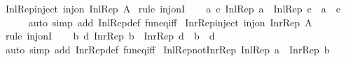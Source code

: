 \begin{isabellebody}
\endisatagproof
{\isafoldproof}%
%
\isadelimproof
\isanewline
%
\endisadelimproof
\isanewline
{}\isamarkupfalse%
\ Inl{\isacharunderscore}{\kern0pt}Rep{\isacharunderscore}{\kern0pt}inject{\isacharcolon}{\kern0pt}\ {\isachardoublequoteopen}inj{\isacharunderscore}{\kern0pt}on\ Inl{\isacharunderscore}{\kern0pt}Rep\ A{\isachardoublequoteclose}\isanewline
%
\isadelimproof
%
\endisadelimproof
%
\isatagproof
{}\isamarkupfalse%
\ {\isacharparenleft}{\kern0pt}rule\ inj{\isacharunderscore}{\kern0pt}onI{\isacharparenright}{\kern0pt}\isanewline
\ \ \isamarkupfalse%
\ {\isachardoublequoteopen}{\isasymAnd}a\ c{\isachardot}{\kern0pt}\ Inl{\isacharunderscore}{\kern0pt}Rep\ a\ {\isacharequal}{\kern0pt}\ Inl{\isacharunderscore}{\kern0pt}Rep\ c\ {\isasymLongrightarrow}\ a\ {\isacharequal}{\kern0pt}\ c{\isachardoublequoteclose}\isanewline
\ \ \ \ \isamarkupfalse%
\ {\isacharparenleft}{\kern0pt}auto\ simp\ add{\isacharcolon}{\kern0pt}\ Inl{\isacharunderscore}{\kern0pt}Rep{\isacharunderscore}{\kern0pt}def\ fun{\isacharunderscore}{\kern0pt}eq{\isacharunderscore}{\kern0pt}iff{\isacharparenright}{\kern0pt}\isanewline
{}\isamarkupfalse%
%
\endisatagproof
{\isafoldproof}%
%
\isadelimproof
\isanewline
%
\endisadelimproof
\isanewline
{}\isamarkupfalse%
\ Inr{\isacharunderscore}{\kern0pt}Rep{\isacharunderscore}{\kern0pt}inject{\isacharcolon}{\kern0pt}\ {\isachardoublequoteopen}inj{\isacharunderscore}{\kern0pt}on\ Inr{\isacharunderscore}{\kern0pt}Rep\ A{\isachardoublequoteclose}\isanewline
%
\isadelimproof
%
\endisadelimproof
%
\isatagproof
{}\isamarkupfalse%
\ {\isacharparenleft}{\kern0pt}rule\ inj{\isacharunderscore}{\kern0pt}onI{\isacharparenright}{\kern0pt}\isanewline
\ \ \isamarkupfalse%
\ {\isachardoublequoteopen}{\isasymAnd}b\ d{\isachardot}{\kern0pt}\ Inr{\isacharunderscore}{\kern0pt}Rep\ b\ {\isacharequal}{\kern0pt}\ Inr{\isacharunderscore}{\kern0pt}Rep\ d\ {\isasymLongrightarrow}\ b\ {\isacharequal}{\kern0pt}\ d{\isachardoublequoteclose}\isanewline
\ \ \ \ \isamarkupfalse%
\ {\isacharparenleft}{\kern0pt}auto\ simp\ add{\isacharcolon}{\kern0pt}\ Inr{\isacharunderscore}{\kern0pt}Rep{\isacharunderscore}{\kern0pt}def\ fun{\isacharunderscore}{\kern0pt}eq{\isacharunderscore}{\kern0pt}iff{\isacharparenright}{\kern0pt}\isanewline
{}\isamarkupfalse%
%
\endisatagproof
{\isafoldproof}%
%
\isadelimproof
\isanewline
%
\endisadelimproof
\isanewline
{}\isamarkupfalse%
\ Inl{\isacharunderscore}{\kern0pt}Rep{\isacharunderscore}{\kern0pt}not{\isacharunderscore}{\kern0pt}Inr{\isacharunderscore}{\kern0pt}Rep{\isacharcolon}{\kern0pt}\ {\isachardoublequoteopen}Inl{\isacharunderscore}{\kern0pt}Rep\ a\ {\isasymnoteq}\ Inr{\isacharunderscore}{\kern0pt}Rep\ b{\isachardoublequoteclose}\isanewline

\end{isabellebody}
